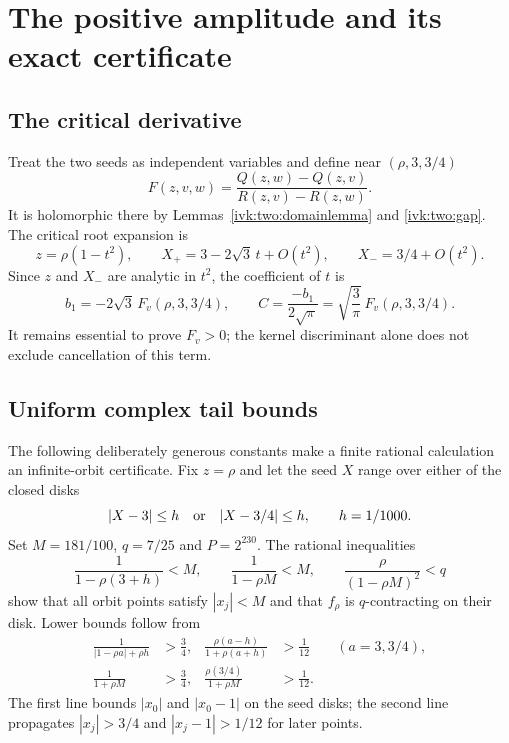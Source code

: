 \documentclass[11pt,letterpaper]{article}
\theoremstyle{remark}\newtheorem{remark}[theorem]{Remark}
\begin{document}
\section{The positive amplitude and its exact certificate}\label{ivk:two:sec:amplitude}
\subsection{The critical derivative}
Treat the two seeds as independent variables and define near
$(\rho,3,3/4)$
\begin{equation}\label{ivk:two:Fdef}
 F(z,v,w)=\frac{Q(z,w)-Q(z,v)}{R(z,v)-R(z,w)}.
\end{equation}
It is holomorphic there by Lemmas~\ref{ivk:two:domainlemma} and \ref{ivk:two:gap}.
The critical root expansion is
\begin{equation}\label{ivk:two:rootexpansion}
 z=\rho(1-t^2),\qquad X_+=3-2\sqrt3\,t+O(t^2),\qquad
 X_-=3/4+O(t^2).
\end{equation}
Since $z$ and $X_-$ are analytic in $t^2$, the coefficient of $t$ is
\begin{equation}\label{ivk:two:amplitude}
 b_1=-2\sqrt3\,F_v(\rho,3,3/4),\qquad
 C=\frac{-b_1}{2\sqrt\pi}=\sqrt{\frac3\pi}\,F_v(\rho,3,3/4).
\end{equation}
It remains essential to prove $F_v>0$; the kernel discriminant alone
does not exclude cancellation of this term.

\subsection{Uniform complex tail bounds}
The following deliberately generous constants make a finite rational
calculation an infinite-orbit certificate. Fix $z=\rho$ and let the
seed $X$ range over either of the closed disks
\[
 |X-3|\le h\quad\hbox{or}\quad|X-3/4|\le h,
 \qquad h=1/1000.
\]
Set $M=181/100$, $q=7/25$ and $P=2^{230}$. The rational inequalities
\begin{equation}\label{ivk:two:certbounds}
 \frac1{1-\rho(3+h)}<M,\qquad
 \frac1{1-\rho M}<M,\qquad
 \frac{\rho}{(1-\rho M)^2}<q
\end{equation}
show that all orbit points satisfy $|x_j|<M$ and that $f_\rho$ is
$q$-contracting on their disk. Lower bounds follow from
\begin{equation}\label{ivk:two:certlower}
\begin{aligned}
 \frac1{|1-\rho a|+\rho h}&>\frac34,
 &\frac{\rho(a-h)}{1+\rho(a+h)}&>\frac1{12}
 &&(a=3,3/4),\\
 \frac1{1+\rho M}&>\frac34,
 &\frac{\rho(3/4)}{1+\rho M}&>\frac1{12}.&&
\end{aligned}
\end{equation}
The first line bounds $|x_0|$ and $|x_0-1|$ on the seed disks; the
second line propagates $|x_j|>3/4$ and $|x_j-1|>1/12$ for later points.
\end{document}
